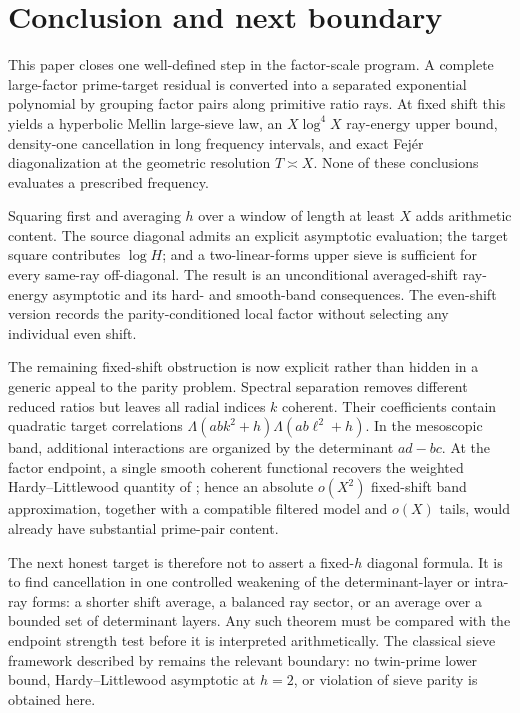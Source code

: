 \section{Conclusion and next boundary}
\label{sec:conclusion}

This paper closes one well-defined step in the factor-scale program.  A
complete large-factor prime-target residual is converted into a separated
exponential polynomial by grouping factor pairs along primitive ratio
rays.  At fixed shift this yields a hyperbolic Mellin large-sieve law, an
$X\log^4X$ ray-energy upper bound, density-one cancellation in long
frequency intervals, and exact Fej\'er diagonalization at the geometric
resolution $T\asymp X$.  None of these conclusions evaluates a prescribed
frequency.

Squaring first and averaging $h$ over a window of length at least $X$
adds arithmetic content.  The source diagonal admits an explicit
asymptotic evaluation;
the target square contributes $\log H$; and a two-linear-forms upper sieve
is sufficient for every same-ray off-diagonal.  The result is an
unconditional averaged-shift ray-energy asymptotic and its hard- and
smooth-band consequences.  The even-shift version records the
parity-conditioned local factor without selecting any individual even
shift.

The remaining fixed-shift obstruction is now explicit rather than hidden
in a generic appeal to the parity problem.  Spectral separation removes
different reduced ratios but leaves all radial indices $k$ coherent.
Their coefficients contain quadratic target correlations
$\Lambda(abk^2+h)\Lambda(ab\ell^2+h)$.  In the mesoscopic band, additional
interactions are organized by the determinant $ad-bc$.  At the factor
endpoint, a single smooth coherent functional recovers the weighted
Hardy--Littlewood quantity of \citet{HardyLittlewood1923}; hence an
absolute $o(X^2)$ fixed-shift band approximation, together with a
compatible filtered model and $o(X)$ tails, would already have substantial
prime-pair content.

The next honest target is therefore not to assert a fixed-$h$ diagonal
formula.  It is to find cancellation in one controlled weakening of the
determinant-layer or intra-ray forms: a shorter shift average, a balanced
ray sector, or an average over a bounded set of determinant layers.  Any
such theorem must be compared with the endpoint strength test before it is
interpreted arithmetically.  The classical sieve framework described by
\citet{IwaniecKowalski2004} remains the relevant boundary: no twin-prime
lower bound, Hardy--Littlewood asymptotic at $h=2$, or violation of sieve
parity is obtained here.
